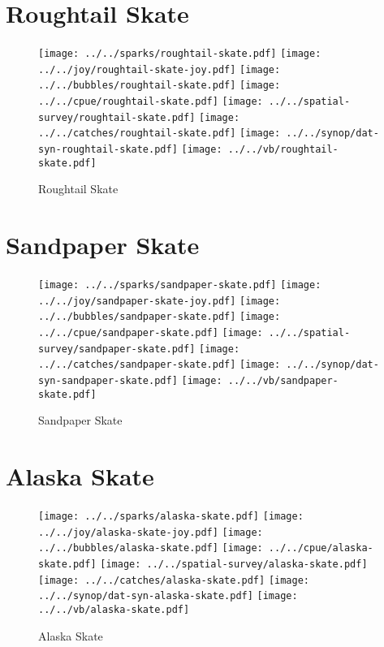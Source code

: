 \section{Roughtail Skate}

\begin{figure}[htbp]
\centering
\texttt{[image: ../../sparks/roughtail-skate.pdf]}
\texttt{[image: ../../joy/roughtail-skate-joy.pdf]}
\texttt{[image: ../../bubbles/roughtail-skate.pdf]}
\texttt{[image: ../../cpue/roughtail-skate.pdf]}
\texttt{[image: ../../spatial-survey/roughtail-skate.pdf]}
\texttt{[image: ../../catches/roughtail-skate.pdf]}
\texttt{[image: ../../synop/dat-syn-roughtail-skate.pdf]}
\texttt{[image: ../../vb/roughtail-skate.pdf]}
\caption{Roughtail Skate}
\end{figure}
\clearpage
\section{Sandpaper Skate}

\begin{figure}[htbp]
\centering
\texttt{[image: ../../sparks/sandpaper-skate.pdf]}
\texttt{[image: ../../joy/sandpaper-skate-joy.pdf]}
\texttt{[image: ../../bubbles/sandpaper-skate.pdf]}
\texttt{[image: ../../cpue/sandpaper-skate.pdf]}
\texttt{[image: ../../spatial-survey/sandpaper-skate.pdf]}
\texttt{[image: ../../catches/sandpaper-skate.pdf]}
\texttt{[image: ../../synop/dat-syn-sandpaper-skate.pdf]}
\texttt{[image: ../../vb/sandpaper-skate.pdf]}
\caption{Sandpaper Skate}
\end{figure}
\clearpage
\section{Alaska Skate}

\begin{figure}[htbp]
\centering
\texttt{[image: ../../sparks/alaska-skate.pdf]}
\texttt{[image: ../../joy/alaska-skate-joy.pdf]}
\texttt{[image: ../../bubbles/alaska-skate.pdf]}
\texttt{[image: ../../cpue/alaska-skate.pdf]}
\texttt{[image: ../../spatial-survey/alaska-skate.pdf]}
\texttt{[image: ../../catches/alaska-skate.pdf]}
\texttt{[image: ../../synop/dat-syn-alaska-skate.pdf]}
\texttt{[image: ../../vb/alaska-skate.pdf]}
\caption{Alaska Skate}
\end{figure}
\clearpage
